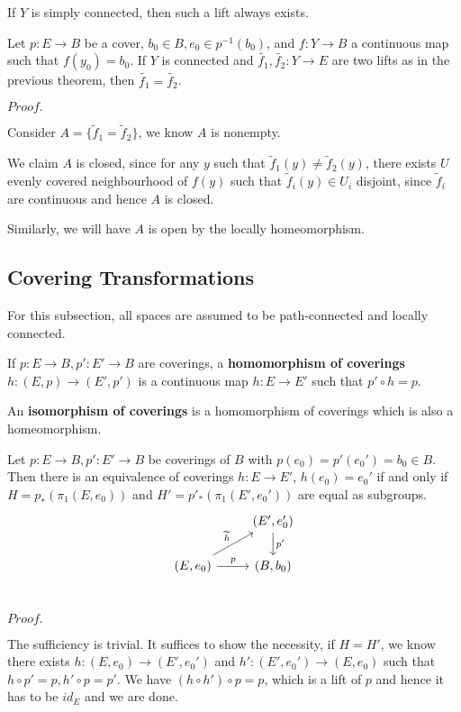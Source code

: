 \documentclass{article}
\newcommand{\Pf}[1]{$Proof.$\par}
\begin{document}
\begin{corollary}
    If $Y$  is simply connected, then such a lift always exists.
\end{corollary}

\begin{proposition} Let $p:E\to B$ be a cover, $b_0 \in B, e_0 \in p^{-1}(b_0)$, and $f:Y\to B$ a continuous map such that $f(y_0) = b_0$. If $Y$ is connected and $\widetilde{f_1},\widetilde{f_2}: Y \to E$ are two lifts as in the previous theorem, then $\widetilde{f_1} = \widetilde{f_2}$.    
\end{proposition}
\Pf\par
    Consider $A = \{\widetilde{f}_1 =\widetilde{f}_2 \}$, we know $A$ is nonempty.\par
    We claim $A$ is closed, since for any $y$ such that $\widetilde{f}_1(y) \neq \widetilde{f}_2(y)$, there exists $U$ evenly covered neighbourhood of $f(y)$ such that $\widetilde{f}_i(y) \in U_i$ disjoint, since $\widetilde{f}_i$ are continuous and hence $A$ is closed.\par
    Similarly, we will have $A$ is open by the locally homeomorphism.

\subsection{Covering Transformations}

For this subsection, all spaces are assumed to be path-connected and locally connected.

\begin{definition}
    If $p:E\to B, p':E'\to B$ are coverings, a \textbf{homomorphism of coverings} $h:(E,p) \to (E',p')$ is a continuous map $h:E\to E'$ such that $p'\circ h = p$.
\end{definition}

\begin{definition}
    An \textbf{isomorphism of coverings} is a homomorphism of coverings which is also a homeomorphism.
\end{definition}

\begin{theorem}
    Let $p:E\to B, p':E'\to B$ be coverings of $B$ with $p(e_0)= p'(e_0') = b_0 \in B$. Then there is an equivalence of coverings $h:E\to E'$, $h(e_0) = e_0'$ if and only if $H = p_*(\pi_1(E,e_0))$ and $H' = p'_*(\pi_1(E',e_0'))$ are equal as subgroups. 
    \[
    \begin{tikzcd}
                                        & (E',e_0')\arrow[d, "p'"]\\
    (E,e_0) \arrow[ru,"\widetilde{h}"] \arrow[r,"p"] & (B,b_0) \\
    \end{tikzcd}
    \]
\end{theorem}
\Pf\par
    The sufficiency is trivial. It suffices to show the necessity, if $H = H'$, we know there exists $h: (E,e_0) \to (E',e_0')$ and $h':(E',e_0') \to (E,e_0)$ such that $h\circ p' = p, h'\circ p = p'$. We have $(h\circ h') \circ p = p$, which is a lift of $p$ and hence it has to be $id_E$ and we are done.
\end{document}
